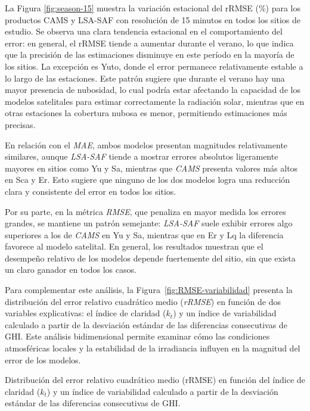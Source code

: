 \documentclass[letterpaper,12pt, twoside]{report}
\providecommand{\DIFdeltex}[1]{{\protect\color{red} \scriptsize #1}} %
\providecommand{\DIFdelFL}[1]{\DIFdel{#1}} %
\providecommand{\DIFdel}[1]{\texorpdfstring{\DIFdeltex{#1}}{}} %
\begin{document}
\DIFdel{La Figura \ref{fig:season-15} muestra la variación estacional del rRMSE (\%) para los productos CAMS y LSA-SAF con resolución de 15 minutos en todos los sitios de estudio. Se observa una clara tendencia estacional en el comportamiento del error: en general, el rRMSE tiende a aumentar durante el verano, lo que indica que la precisión de las estimaciones disminuye en este período en la mayoría de los sitios. La excepción es Yuto, donde el error permanece relativamente estable a lo largo de las estaciones. Este patrón sugiere que durante el verano hay una mayor presencia de nubosidad, lo cual podría estar afectando la capacidad de los modelos satelitales para estimar correctamente la radiación solar, mientras que en otras estaciones la cobertura nubosa es menor, permitiendo estimaciones más precisas.
}%

\DIFdel{En relación con el \textit{MAE}, ambos modelos presentan magnitudes relativamente similares, aunque \textit{LSA-SAF} tiende a mostrar errores absolutos ligeramente mayores en sitios como Yu y Sa, mientras que \textit{CAMS} presenta valores más altos en Sca y Er. Esto sugiere que ninguno de los dos modelos logra una reducción clara y consistente del error en todos los sitios.
}%

\DIFdel{Por su parte, en la métrica \textit{RMSE}, que penaliza en mayor medida los errores grandes, se mantiene un patrón semejante: \textit{LSA-SAF} suele exhibir errores algo superiores a los de \textit{CAMS} en Yu y Sa, mientras que en Er y Lq la diferencia favorece al modelo satelital. En general, los resultados muestran que el desempeño relativo de los modelos depende fuertemente del sitio, sin que exista un claro ganador en todos los casos.
}%

\DIFdel{Para complementar este análisis, la Figura~\ref{fig:RMSE-variabilidad} presenta la distribución del error relativo cuadrático medio (\textit{rRMSE}) en función de dos variables explicativas: el índice de claridad ($k_t$) y un índice de variabilidad calculado a partir de la desviación estándar de las diferencias consecutivas de GHI. Este análisis bidimensional permite examinar cómo las condiciones atmosféricas locales y la estabilidad de la irradiancia influyen en la magnitud del error de los modelos.
}%

{%
\DIFdelFL{Distribución del error relativo cuadrático medio (rRMSE) en función del índice de claridad ($k_t$) y un índice de variabilidad calculado a partir de la desviación estándar de las diferencias consecutivas de GHI.}}
\end{document}
